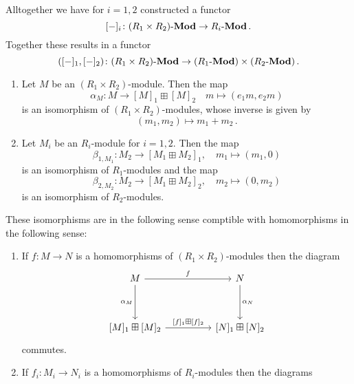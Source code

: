 \begin{remark}
  \label{remark: functor into product}
  Alltogether we have for $i = 1, 2$ constructed a functor
  \[
            [-]_i
    \colon  (R_1 \times R_2)\text{-}\mathbf{Mod}
    \to     R_i\text{-}\mathbf{Mod} \,.
  \]
  Together these results in a functor
  \[
            ([-]_1, [-]_2)
    \colon  (R_1 \times R_2)\text{-}\mathbf{Mod}
    \to     (R_1\text{-}\mathbf{Mod}) \times (R_2\text{-}\mathbf{Mod}) \,.
  \]
\end{remark}


\begin{theorem}
  \label{theorem: equivalence of modules for objects}
  \leavevmode
  \begin{enumerate}
    \item
      Let $M$ be an $(R_1 \times R_2)$-module.
      Then the map
      \[
                \alpha_M
        \colon  M
        \to     [M]_1 \boxplus [M]_2
        \quad   m
        \mapsto (e_1 m, e_2 m)
      \]
      is an isomorphism of $(R_1 \times R_2)$-modules, whose inverse is given by
      \[
                (m_1, m_2)
        \mapsto m_1 + m_2 \,.
      \]
    \item
      Let $M_i$ be an $R_i$-module for $i = 1, 2$.
      Then the map
      \[
                \beta_{1, M_1}
        \colon  M_2
        \to     [M_1 \boxplus M_2]_1,
        \quad   m_1
        \mapsto (m_1, 0)
      \]
      is an isomorphism of $R_1$-modules and the map
      \[
                \beta_{2, M_2}
        \colon  M_2
        \to     [M_1 \boxplus M_2]_2,
        \quad   m_2
        \mapsto (0, m_2)
      \]
      is an isomorphism of $R_2$-modules.
  \end{enumerate}
  These isomorphisms are in the following sense comptible with homomorphisms in the following sense:
  \begin{enumerate}[resume]
    \item
      If $f \colon M \to N$ is a homomorphisms of $(R_1 \times R_2)$-modules then the diagram
      \[
        \begin{tikzcd}[sep = huge]
            M
            \arrow{r}[above]{f}
            \arrow{d}[left]{\alpha_M}
          & N
            \arrow{d}[right]{\alpha_N}
          \\
            {[M]_1} \boxplus {[M]_2}
            \arrow{r}[above]{{[f]_1} \boxplus {[f]_2}}
          & {[N]_1} \boxplus {[N]_2}
        \end{tikzcd}
      \]
      commutes.
    \item
      If $f_i \colon M_i \to N_i$ is a homomorphisms of $R_i$-modules then the diagrams

\end{enumerate}
\end{theorem}
